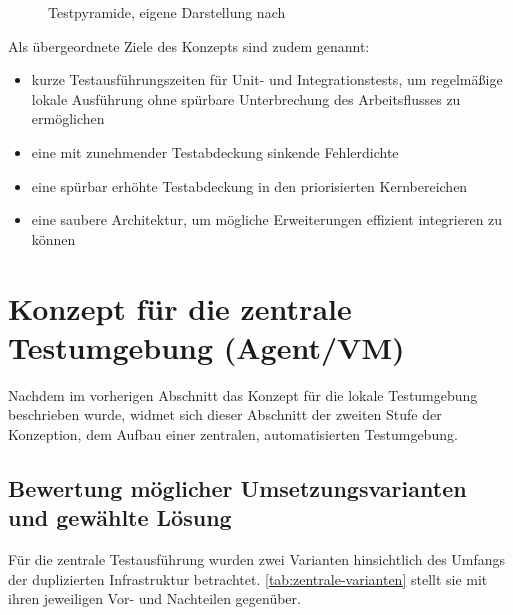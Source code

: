 \begin{figure}[H]
\centering
{}
\caption{Testpyramide, eigene Darstellung nach \textcite{QFTest2024}}
\label{fig:testpyramide}
\end{figure}

Als übergeordnete Ziele des Konzepts sind zudem genannt:
\begin{itemize}
    \item kurze Testausführungszeiten für Unit- und Integrationstests, um regelmäßige lokale Ausführung ohne spürbare Unterbrechung des Arbeitsflusses zu ermöglichen
    \item eine mit zunehmender Testabdeckung sinkende Fehlerdichte
    \item eine spürbar erhöhte Testabdeckung in den priorisierten Kernbereichen
    \item eine saubere Architektur, um mögliche Erweiterungen effizient integrieren zu können
\end{itemize}


\section{Konzept für die zentrale Testumgebung (Agent/VM)}
Nachdem im vorherigen Abschnitt das Konzept für die lokale Testumgebung beschrieben wurde, widmet sich dieser Abschnitt der zweiten Stufe der Konzeption, dem Aufbau einer zentralen, automatisierten Testumgebung.

\subsection{Bewertung möglicher Umsetzungsvarianten und gewählte Lösung}
Für die zentrale Testausführung wurden zwei Varianten hinsichtlich des Umfangs der duplizierten Infrastruktur betrachtet. \autoref{tab:zentrale-varianten} stellt sie mit ihren jeweiligen Vor- und Nachteilen gegenüber.

